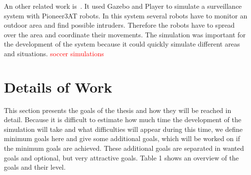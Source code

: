 \documentclass[11pt,a4paper,titlepage]{article}
\begin{document}
An other related work is~\cite{SurveillanceSystem}. It used Gazebo and Player to simulate a surveillance system with Pioneer3AT robots. In this system several robots have to monitor an outdoor area and find possible intruders. Therefore the robots have to spread over the area and coordinate their movements. The simulation was important for the development of the system because it could quickly simulate different areas and situations.
\textcolor{red}{soccer simulations}


\section{Details of Work}
This section presents the goals of the thesis and how they will be reached in detail. Because it is difficult to estimate how much time the development of the simulation will take and what difficulties will appear during this time, we define minimum goals here and give some additional goals, which will be worked on if the minimum goals are achieved. These additional goals are separated in wanted goals and optional, but very attractive goals. Table 1 shows an overview of the goals and their level.
\end{document}
